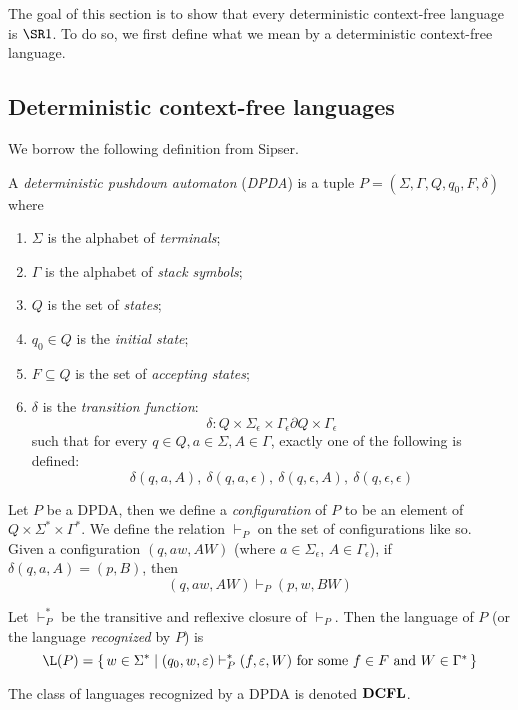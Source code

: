 \documentclass{llncs}
\begin{document}
The goal of this section is to show that every deterministic context-free language is $\SR1$.
To do so, we first define what we mean by a deterministic context-free language.

\subsection{Deterministic context-free languages}

We borrow the following definition from Sipser.

\begin{definition}

    A \emph{deterministic pushdown automaton} (\emph{DPDA}) is a tuple $P=(\Sigma,\Gamma,Q,q_0,F,\delta)$
    where
    \begin{enumerate}
        \item $\Sigma$ is the alphabet of \emph{terminals};
        \item $\Gamma$ is the alphabet of \emph{stack symbols};
        \item $Q$ is the set of \emph{states};
        \item $q_0\in Q$ is the \emph{initial state};
        \item $F\subseteq Q$ is the set of \emph{accepting states};
        \item $\delta$ is the \emph{transition function}:
        $$ \delta\colon Q\times\Sigma_\epsilon\times\Gamma_\epsilon\partial Q\times\Gamma_\epsilon $$
        such that for every $q\in Q,a\in\Sigma,A\in\Gamma$, exactly one of the following is defined:
        $$ \delta(q,a,A),\ \delta(q,a,\epsilon),\ \delta(q,\epsilon,A),\ \delta(q,\epsilon,\epsilon) $$
    \end{enumerate}

\end{definition}

\begin{definition}

    Let $P$ be a DPDA, then we define a \emph{configuration} of $P$ to be an element of
    $Q\times\Sigma^*\times\Gamma^*$.
    We define the relation $\vdash_P$ on the set of configurations like so.
    Given a configuration $(q,aw,AW)$ (where $a\in\Sigma_\epsilon$, $A\in\Gamma_\epsilon$), if
    $\delta(q,a,A)=(p,B)$, then
    $$ (q,aw,AW) \vdash_P (p,w,BW) $$

    Let $\vdash^*_P$ be the transitive and reflexive closure of $\vdash_P$.
    Then the language of $P$ (or the language \emph{recognized} by $P$) is
    $$ \L(P) = \set{w\in\Sigma^*}[(q_0,w,\epsilon)\vdash^*_P(f,\epsilon,W)\hbox{ for some $f\in F$ and
    $W\in\Gamma^*$}] $$

    The class of languages recognized by a DPDA is denoted $\hbox{{\bf DCFL}}$.

\end{definition}
\end{document}
